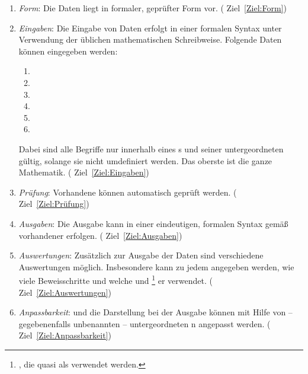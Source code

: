 \begin{enumerate}
	
	\item \label{Anforderung:Form} \emph{Form}:
	Die Daten liegt in formaler, geprüfter Form vor.
	(\seename{} Ziel~\vref{Ziel:Form})
	
	\item \label{Anforderung:Eingaben} \emph{Eingaben}:
	Die Eingabe von Daten erfolgt in einer formalen Syntax
	unter Verwendung der üblichen mathematischen Schreibweise.
	Folgende Daten können eingegeben werden:
	\begin{enumerate}
		\item {}
		\item {}
		\item {}
		\item {}
		\item {}
		\item {}
	\end{enumerate}
	Dabei sind alle Begriffe nur innerhalb eines s
	und seiner untergeordneten  gültig,
	solange sie nicht umdefiniert werden.
	Das oberste  ist die ganze Mathematik.
	(\seename{} Ziel~\vref{Ziel:Eingaben})
	
	\item \label{Anforderung:Prüfung} \emph{Prüfung}:
	Vorhandene  können automatisch geprüft werden.
	(\seename{} Ziel~\vref{Ziel:Prüfung})
	
	\item \label{Anforderung:Ausgaben} \emph{Ausgaben}:
	Die Ausgabe kann in einer eindeutigen, formalen Syntax
	gemäß vorhandener  erfolgen.
	(\seename{} Ziel~\vref{Ziel:Ausgaben})
	
	\item \label{Anforderung:Auswertungen} \emph{Auswertungen}:
	Zusätzlich zur Ausgabe der Daten sind verschiedene Auswertungen möglich.
	Insbesondere kann zu jedem  angegeben werden,
	wie viele Beweisschritte und welche  und %
	\footnote{, die quasi als  verwendet werden.}
	er verwendet.
	(\seename{} Ziel~\vref{Ziel:Auswertungen})
	
	\item \label{Anforderung:Anpassbarkeit} \emph{Anpassbarkeit}:
	und die Darstellung bei der Ausgabe können mit Hilfe von
	-- gegebenenfalls unbenannten --
	untergeordneten n angepasst werden.
	(\seename{} Ziel~\vref{Ziel:Anpassbarkeit})
	

\end{enumerate}
